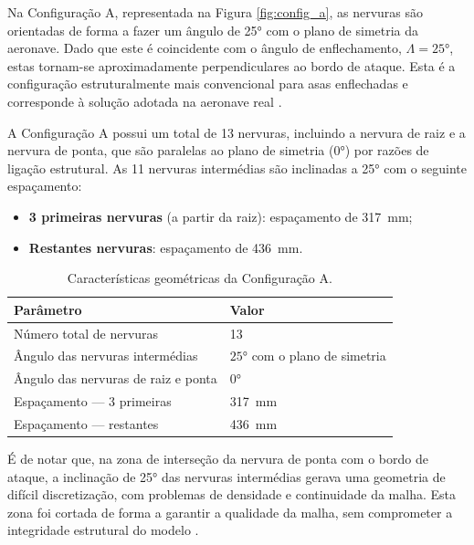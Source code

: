 \documentclass[11pt,oneside,a4paper,final]{report}
\begin{document}
Na Configuração A, representada na Figura \ref{fig:config_a}, as nervuras são orientadas de forma a fazer um ângulo de 25° com o plano de simetria da aeronave. Dado que este é coincidente com o ângulo de enflechamento, $\Lambda = \ang{25}$, estas tornam-se aproximadamente perpendiculares ao bordo de ataque. Esta é a configuração estruturalmente mais convencional para asas enflechadas e corresponde à solução adotada na aeronave real \cite{Niu1988, GarciaFernandez2025}.

A Configuração A possui um total de 13 nervuras, incluindo a nervura de raiz e a nervura de ponta, que são paralelas ao plano de simetria (0°) por razões de ligação estrutural. As 11 nervuras intermédias são inclinadas a 25° com o seguinte espaçamento:

\begin{itemize}
    \item \textbf{3 primeiras nervuras} (a partir da raiz): 
    espaçamento de \SI{317}{\milli\meter};
    \item \textbf{Restantes nervuras}: espaçamento de 
    \SI{436}{\milli\meter}.
\end{itemize}

\begin{table}[H]
\centering
\caption{Características geométricas da Configuração A.}
\label{tab:config_a}
\renewcommand{\arraystretch}{1.4}
\begin{tabularx}{\textwidth}{p{6cm} X}
\toprule
\textbf{Parâmetro} & \textbf{Valor} \\
\midrule
Número total de nervuras            & 13 \\
Ângulo das nervuras intermédias     
    & $\ang{25}$ com o plano de simetria \\
Ângulo das nervuras de raiz e ponta 
    & $ \ang{0}$ \\
Espaçamento --- 3 primeiras         
    & \SI{317}{\milli\meter} \\
Espaçamento --- restantes           
    & \SI{436}{\milli\meter} \\
\bottomrule
\end{tabularx}
\end{table}

É de notar que, na zona de interseção da nervura de ponta com o bordo de ataque, a inclinação de 25° das nervuras intermédias gerava uma geometria de difícil discretização, com problemas de densidade e continuidade da malha. Esta zona foi cortada de forma a garantir a qualidade da malha, sem comprometer a integridade estrutural do modelo \cite{Bathe2014, Cook2001}.
\end{document}
